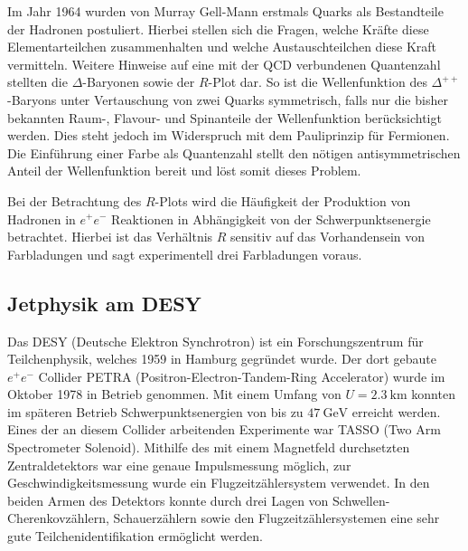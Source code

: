 Im Jahr 1964 wurden von Murray Gell-Mann erstmals Quarks als Bestandteile der Hadronen postuliert.
Hierbei stellen sich die Fragen, welche Kräfte diese Elementarteilchen zusammenhalten und welche Austauschteilchen diese Kraft vermitteln.
Weitere Hinweise auf eine mit der QCD verbundenen Quantenzahl stellten die $\Delta$-Baryonen sowie der $R$-Plot dar.
So ist die Wellenfunktion des $\Delta^{++}$-Baryons unter Vertauschung von zwei Quarks symmetrisch, falls nur die bisher bekannten Raum-, Flavour- und Spinanteile der Wellenfunktion berücksichtigt werden.
Dies steht jedoch im Widerspruch mit dem Pauliprinzip für Fermionen.
Die Einführung einer Farbe als Quantenzahl stellt den nötigen antisymmetrischen Anteil der Wellenfunktion bereit und löst somit dieses Problem.

Bei der Betrachtung des $R$-Plots wird die Häufigkeit der Produktion von Hadronen in $e^+ e^-$ Reaktionen in Abhängigkeit von der Schwerpunktsenergie betrachtet.
Hierbei ist das Verhältnis $R$ sensitiv auf das Vorhandensein von Farbladungen und sagt experimentell drei Farbladungen voraus.

\subsection{Jetphysik am DESY}
Das DESY (Deutsche Elektron Synchrotron) ist ein Forschungszentrum für Teilchenphysik, welches 1959 in Hamburg gegründet wurde.
Der dort gebaute $e^+ e^-$ Collider PETRA (Positron-Electron-Tandem-Ring Accelerator) wurde im Oktober 1978 in Betrieb genommen.
Mit einem Umfang von $U=\SI{2.3}{\kilo\metre}$ konnten im späteren Betrieb Schwerpunktsenergien von bis zu $\SI{47}{\giga\electronvolt}$ erreicht werden.
Eines der an diesem Collider arbeitenden Experimente war TASSO (Two Arm Spectrometer Solenoid).
Mithilfe des mit einem Magnetfeld durchsetzten Zentraldetektors war eine genaue Impulsmessung möglich, zur Geschwindigkeitsmessung wurde ein Flugzeitzählersystem verwendet.
In den beiden Armen des Detektors konnte durch drei Lagen von Schwellen-Cherenkovzählern, Schauerzählern sowie den Flugzeitzählersystemen eine sehr gute Teilchenidentifikation ermöglicht werden.

